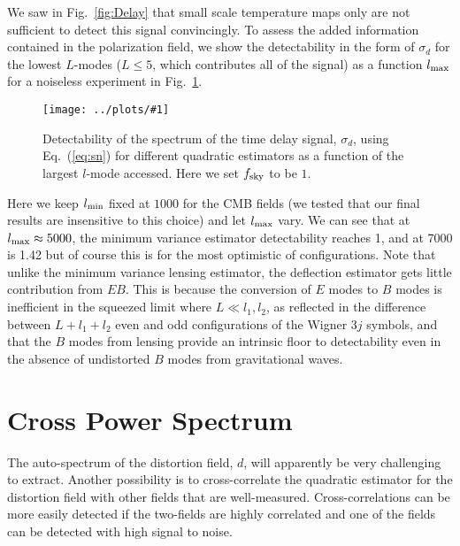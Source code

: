 \documentclass[prd,amsmath,amssymb,floatfix,superscriptaddress,nofootinbib,twocolumn]{revtex4-1}
\newcommand{\ec}[1]{Eq.~(\ref{eq:#1})}
\newcommand{\sfig}[2]{
\texttt{[image: ../plots/\#1]}
        }
\newcommand{\Sfig}[2]{
   \begin{figure}[thbp]
   \begin{center}
    \sfig{#1.pdf}{\columnwidth}
    \caption{{\small #2}}
    \label{fig:#1}
     \end{center}
   \end{figure}
}
\newcommand{\rf}[1]{\ref{fig:#1}}
\begin{document}
We saw in Fig.~\rf{Delay} that small scale temperature maps only are not sufficient to detect this signal convincingly. To assess the added information contained in the polarization field, we show the detectability in the form of $\sigma_d$ for the lowest $L$-modes ($L\leqslant 5$, which contributes all of the signal) as a function $l_{\rm max}$ for a noiseless experiment in Fig.~\rf{StoN}.

\Sfig{StoN}{Detectability of the spectrum of the time delay signal, $\sigma_d$, using \ec{sn} for different quadratic estimators as a function of the largest $l$-mode accessed. Here we set $f_{\rm sky}$ to be $1$.}
Here we keep $l_{\rm min}$ fixed at $1000$ for the CMB fields (we tested that our final results are insensitive to this choice) and let $l_{\rm max}$ vary.
We can see that at $l_{\rm max} \approx 5000$, the minimum variance estimator detectability reaches 1, and at 7000 is 1.42 but of course this is for the most optimistic of configurations. 
Note that unlike the minimum variance lensing  estimator, the deflection estimator
gets little contribution from $EB$.   This is because the conversion of $E$ modes to $B$
modes is inefficient in the squeezed limit where $L\ll l_1,l_2$, as reflected in the difference between
$L+l_1+l_2$ even and odd configurations of the Wigner 3$j$ symbols, and that the $B$ modes from lensing
provide an intrinsic floor to detectability even in the absence of undistorted $B$ modes
from gravitational waves.



\section{Cross Power Spectrum}
\label{sec:cross}

The auto-spectrum of the distortion field, $d$, will apparently be very challenging to extract. Another possibility is to cross-correlate the quadratic estimator for the distortion field with other fields that are well-measured. Cross-correlations can be more easily detected if the two-fields are highly correlated and one of the fields can be detected with high signal to noise. 
\end{document}
